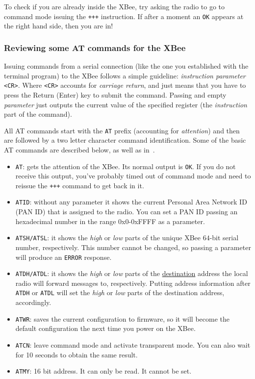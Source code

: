 To check if you are already inside the XBee, try asking the radio to go to command mode issuing the \texttt{+++} instruction. If after a moment an \texttt{OK} appears at the right hand side, then you are in!

\subsubsection{Reviewing some AT commands for the XBee}

Issuing commands from a serial connection (like the one you established with the terminal program) to the XBee follows a simple guideline: \emph{instruction parameter} \texttt{<CR>}. Where \texttt{<CR>} accounts for \emph{carriage return}, and just means that you have to press the Return (Enter) key to submit the command. Passing and empty \emph{parameter} just outputs the current value of the specified register (the \emph{instruction} part of the command).

All AT commands start with the \texttt{AT} prefix (accounting for \emph{attention}) and then are followed by a two letter character command identification. Some of the basic AT commands are described below, as well as in~\cite{faludi2010bws}.

\begin{itemize}
	\item \texttt{AT}: gets the attention of the XBee. Its normal output is \texttt{OK}. If you do not receive this output,  you've probably timed out of command mode and need to reissue the \texttt{+++} command to get back in it.
	\item \texttt{ATID}: without any parameter it shows the current Personal Area Network ID (PAN ID) that is assigned to the radio. You can set a PAN ID passing an hexadecimal number in the range $0$x$0$-$0$xFFFF as a parameter.
	\item \texttt{ATSH/ATSL}: it shows the \emph{high} or \emph{low} parts of the unique XBee $64$-bit serial number, respectively. This number cannot be changed, so passing a parameter will produce an \texttt{ERROR} response.
	\item \texttt{ATDH/ATDL}: it shows the \emph{high} or \emph{low} parts of the \underline{destination} address the local radio will forward messages to, respectively. Putting address information after \texttt{ATDH} or \texttt{ATDL} will set the \emph{high} or \emph{low} parts of the destination address, accordingly.
	\item \texttt{ATWR}: saves the current configuration to firmware, so it will become the default configuration the next time you power on the XBee.
    \item \texttt{ATCN}: leave command mode and activate transparent mode. You can also wait for 10 seconds to obtain the same result.
    \item \texttt{ATMY}: 16 bit address. It can only be read. It cannot be set.
\end{itemize}

		

